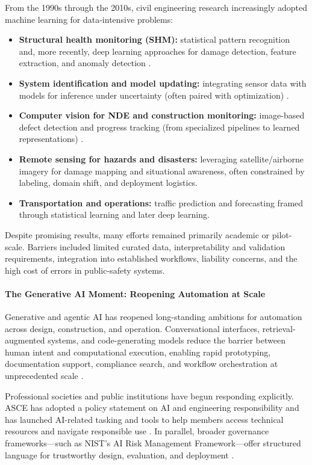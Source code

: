 \documentclass[12pt]{article}
\begin{document}
From the 1990s through the 2010s, civil engineering research increasingly adopted machine learning for data-intensive problems:
\begin{itemize}
\item \textbf{Structural health monitoring (SHM):} statistical pattern recognition and, more recently, deep learning approaches for damage detection, feature extraction, and anomaly detection \cite{cha_etal_2024_dl_shm_review}.

\item \textbf{System identification and model updating:} integrating sensor data with models for inference under uncertainty (often paired with optimization) \cite{farrar_worden_2007}.
\item \textbf{Computer vision for NDE and construction monitoring:} image-based defect detection and progress tracking (from specialized pipelines to learned representations) \cite{lecun_bengio_hinton_2015}.
\item \textbf{Remote sensing for hazards and disasters:} leveraging satellite/airborne imagery for damage mapping and situational awareness, often constrained by labeling, domain shift, and deployment logistics.
\item \textbf{Transportation and operations:} traffic prediction and forecasting framed through statistical learning and later deep learning.
\end{itemize}

Despite promising results, many efforts remained primarily academic or pilot-scale. Barriers included limited curated data, interpretability and validation requirements, integration into established workflows, liability concerns, and the high cost of errors in public-safety systems.

\paragraph{The Generative AI Moment: Reopening Automation at Scale}
Generative and agentic AI has reopened long-standing ambitions for automation across design, construction, and operation. Conversational interfaces, retrieval-augmented systems, and code-generating models reduce the barrier between human intent and computational execution, enabling rapid prototyping, documentation support, compliance search, and workflow orchestration at unprecedented scale \cite{stanford_ai_index_2024}.


Professional societies and public institutions have begun responding explicitly. ASCE has adopted a policy statement on AI and engineering responsibility and has launched AI-related tasking and tools to help members access technical resources and navigate responsible use \cite{asce_ps573_2024,asce_ai_tools_2025}. In parallel, broader governance frameworks—such as NIST’s AI Risk Management Framework—offer structured language for trustworthy design, evaluation, and deployment \cite{nist_airmf_2023}.
\end{document}
